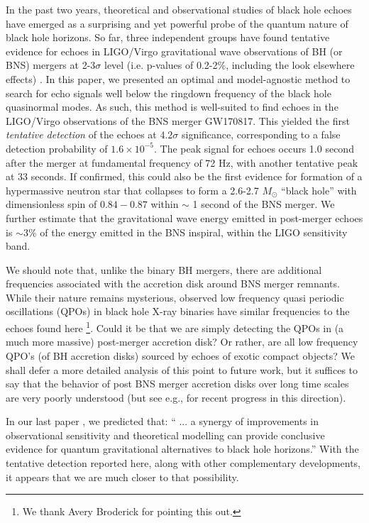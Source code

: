 \documentclass[a4paper,11pt]{article}
\begin{document}
In the past two years, theoretical and observational studies of black hole echoes have emerged as a surprising and yet powerful probe of the quantum nature of black hole horizons. So far, three independent groups have found tentative evidence for echoes in LIGO/Virgo gravitational wave observations of BH (or BNS) mergers at 2-3$\sigma$ level (i.e. p-values of 0.2-2\%, including the look elsewhere effects)  \cite{Conklin:2017lwb,Abedi:2016hgu, Westerweck:2017hus}. In this paper, we presented an optimal and model-agnostic method to search for echo signals well below the ringdown frequency of the black hole quasinormal modes.  As such, this method is well-suited to find echoes in the LIGO/Virgo observations of the BNS merger GW170817. This yielded the first {\it tentative detection} of the echoes at $4.2\sigma$ significance, corresponding to a false detection probability of $1.6 \times 10^{-5}$. The peak signal for echoes occurs 1.0 second after the merger at fundamental frequency of 72 Hz, with another tentative peak at 33 seconds. If confirmed, this could also be the first evidence for formation of a hypermassive neutron star that collapses to form a 2.6-2.7 $M_\odot$ ``black hole'' with dimensionless spin of $0.84-0.87$ within $\sim$ 1 second of the BNS merger. We further estimate that the gravitational wave energy emitted in post-merger echoes is $\sim 3\%$ of the energy emitted in the BNS inspiral, within the LIGO sensitivity band.   

We should note that, unlike the binary BH mergers, there are additional frequencies associated with the accretion disk around BNS merger remnants. While their nature remains mysterious, observed low frequency quasi periodic oscillations (QPOs) in black hole X-ray binaries have similar frequencies to the echoes found here \cite{Motta:2016vwf}\footnote{We thank Avery Broderick for pointing this out.}. Could it be that we are simply detecting the QPOs in (a much more massive) post-merger accretion disk? Or rather, are all low frequency QPO's (of BH accretion disks) sourced by echoes of exotic compact objects?  We shall defer a more detailed analysis of this point to future work, but it suffices to say that the behavior of post BNS merger accretion disks over long time scales are very poorly understood (but see e.g., \cite{Siegel:2017jug} for recent progress in this direction).   

In our last paper \cite{Abedi:2016hgu}, we predicted that: `` ...  a synergy of improvements in observational sensitivity and theoretical modelling can provide conclusive evidence for quantum gravitational alternatives to black hole horizons.'' With the tentative detection reported here, along with other complementary developments, it appears that we are much closer to that possibility. 
\end{document}
